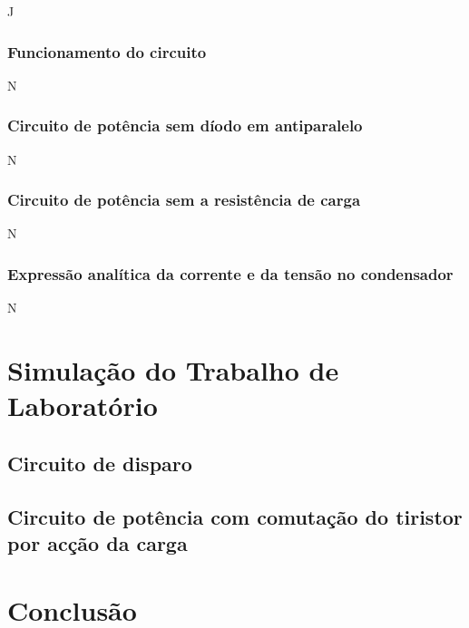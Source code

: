 \documentclass[a4paper,11pt]{article}
\numberwithin{equation}{section}
\begin{document}
J

\subsubsection{Funcionamento do circuito}

N

\subsubsection{Circuito de potência sem díodo em antiparalelo}

N

\subsubsection{Circuito de potência sem a resistência de carga}

N

\subsubsection{Expressão analítica da corrente e da tensão no condensador}

N

\pagebreak

\section{Simulação do Trabalho de Laboratório}

\subsection{Circuito de disparo}

\subsection{Circuito de potência com comutação do tiristor por acção da carga}

\pagebreak

\section{Conclusão}
\end{document}
